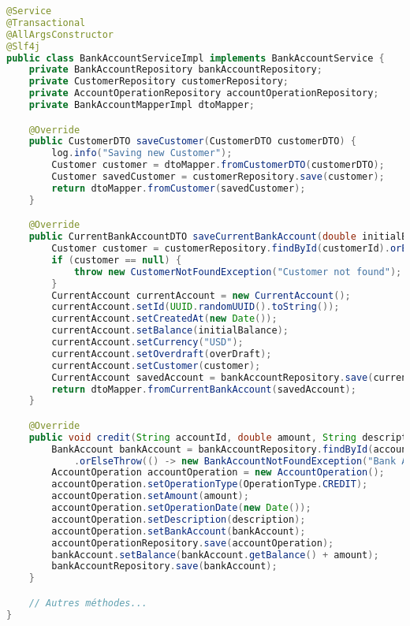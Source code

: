 \documentclass[12pt,a4paper]{report}
\begin{document}
\begin{lstlisting}[language=Java, caption=BankAccountServiceImpl.java (extrait)]
@Service
@Transactional
@AllArgsConstructor
@Slf4j
public class BankAccountServiceImpl implements BankAccountService {
    private BankAccountRepository bankAccountRepository;
    private CustomerRepository customerRepository;
    private AccountOperationRepository accountOperationRepository;
    private BankAccountMapperImpl dtoMapper;

    @Override
    public CustomerDTO saveCustomer(CustomerDTO customerDTO) {
        log.info("Saving new Customer");
        Customer customer = dtoMapper.fromCustomerDTO(customerDTO);
        Customer savedCustomer = customerRepository.save(customer);
        return dtoMapper.fromCustomer(savedCustomer);
    }

    @Override
    public CurrentBankAccountDTO saveCurrentBankAccount(double initialBalance, double overDraft, Long customerId) throws CustomerNotFoundException {
        Customer customer = customerRepository.findById(customerId).orElse(null);
        if (customer == null) {
            throw new CustomerNotFoundException("Customer not found");
        }
        CurrentAccount currentAccount = new CurrentAccount();
        currentAccount.setId(UUID.randomUUID().toString());
        currentAccount.setCreatedAt(new Date());
        currentAccount.setBalance(initialBalance);
        currentAccount.setCurrency("USD");
        currentAccount.setOverdraft(overDraft);
        currentAccount.setCustomer(customer);
        CurrentAccount savedAccount = bankAccountRepository.save(currentAccount);
        return dtoMapper.fromCurrentBankAccount(savedAccount);
    }

    @Override
    public void credit(String accountId, double amount, String description) throws BankAccountNotFoundException {
        BankAccount bankAccount = bankAccountRepository.findById(accountId)
            .orElseThrow(() -> new BankAccountNotFoundException("Bank Account not found"));
        AccountOperation accountOperation = new AccountOperation();
        accountOperation.setOperationType(OperationType.CREDIT);
        accountOperation.setAmount(amount);
        accountOperation.setOperationDate(new Date());
        accountOperation.setDescription(description);
        accountOperation.setBankAccount(bankAccount);
        accountOperationRepository.save(accountOperation);
        bankAccount.setBalance(bankAccount.getBalance() + amount);
        bankAccountRepository.save(bankAccount);
    }

    // Autres méthodes...
}
\end{lstlisting}
\end{document}

